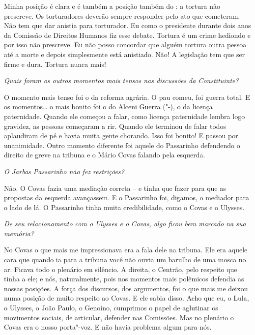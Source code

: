 Minha posição é clara e é também a posição também do :
a tortura não prescreve. Os torturadores deverão sempre responder pelo
ato que cometeram. Não tem que dar anistia para torturador. Eu como o
presidente durante dois anos da Comissão de Direitos Humanos fiz esse
debate. Tortura é um crime hediondo e por isso não prescreve. Eu não
posso concordar que alguém tortura outra pessoa até a morte e depois
simplesmente está anistiado. Não! A legislação tem que ser firme e dura.
Tortura nunca mais!

\medskip

\noindent\emph{Quais foram os outros momentos mais tensos nas discussões da
Constituinte?}

O momento mais tenso foi o da reforma agrária. O pau
comeu, foi guerra total. E os momentos\ldots{} o mais bonito foi o do Alceni
Guerra ("-), o da licença paternidade. Quando ele começou a falar,
como licença paternidade lembra logo gravidez, as pessoas começaram a
rir. Quando ele terminou de falar todos aplaudiram de pé e havia muita
gente chorando. Isso foi bonito! E passou por unanimidade. Outro momento
diferente foi aquele do Passarinho defendendo o direito de greve na
tribuna e o Mário Covas falando pela esquerda.

\pagebreak

\noindent\emph{O Jarbas Passarinho não fez restrições?}

Não. O Covas fazia uma mediação correta -- e tinha que
fazer para que as propostas da esquerda avançassem. E o Passarinho foi,
digamos, o mediador para o lado de lá. O Passarinho tinha muita
credibilidade, como o Covas e o Ulysses.

\medskip

\noindent\emph{De seu relacionamento com o Ulysses e o Covas, algo ficou bem
marcado na sua memória?}

No Covas o que mais me impressionava era a fala dele na
tribuna. Ele era aquele cara que quando ia para a tribuna você não ouvia
um barulho de uma mosca no ar. Ficava todo o plenário em silêncio. A
direita, o Centrão, pelo respeito que tinha a ele; e nós, naturalmente,
pois nos momentos mais polêmicos defendia as nossas posições. A força
dos discursos, dos argumentos, foi o que mais me deixou numa posição de
muito respeito ao Covas. E ele sabia disso. Acho que eu, o Lula, o
Ulysses, o João Paulo, o Genoíno, cumprimos o papel de aglutinar
os movimentos sociais, de articular, defender nas Comissões. Mas no
plenário o Covas era o nosso porta"-voz. E não havia problema algum para
nós.

